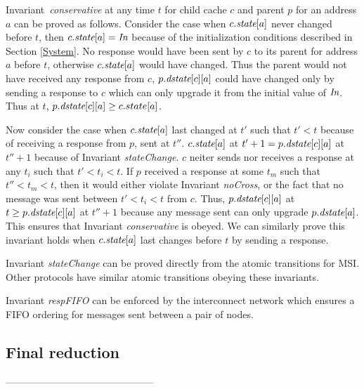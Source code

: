 Invariant~\textit{conservative} at any time $t$ for child cache $c$ and parent
$p$ for an address $a$ can be proved as follows. Consider the case when
$c.\textit{state}[a]$ never changed before $t$, then $c.\textit{state}[a] = \textit{In}$ because of the
initialization conditions described in Section \ref{System}. No response would
have been sent by $c$ to its parent for address $a$ before $t$, otherwise
$c.\textit{state}[a]$ would have changed. Thus the parent would not have received any
response from $c$, $p.\textit{dstate}[c][a]$ could have changed only by sending a
response to $c$ which can only upgrade it from the initial value of $\textit{In}$. Thus
at $t$, $p.\textit{dstate}[c][a] \ge c.state[a]$.

Now consider the case when $c.\textit{state}[a]$ last changed at $t'$ such that $t' <
t$ because of receiving a response from $p$, sent at $t''$. $c.\textit{state}[a]$ at
$t'+1 = p.\textit{dstate}[c][a]$ at $t''+1$ because of Invariant \textit{stateChange}.
$c$ neiter sends nor receives a response at any $t_i$ such that $t' < t_i < t$.
If $p$ received a response at some $t_m$ such that $t'' < t_m < t$,
then it would either violate Invariant \textit{noCross}, or the fact that no
message was sent between $t' < t_i < t$ from $c$. Thus, $p.\textit{dstate}[c][a]$ at $t
\ge p.\textit{dstate}[c][a]$ at $t''+1$ because any message sent can only upgrade
$p.\textit{dstate}[a]$. This ensures that Invariant \textit{conservative} is obeyed. We
can similarly prove this invariant holds when $c.\textit{state}[a]$ last changes before
$t$ by sending a response.

Invariant \textit{stateChange} can be proved directly from the atomic
transitions for MSI. Other protocols have similar atomic transitions obeying
these invariants.

Invariant \textit{respFIFO} can be enforced by the interconnect network which
ensures a FIFO ordering for messages sent between a pair of nodes.

\subsection{Final reduction}

---------------------------------------------


